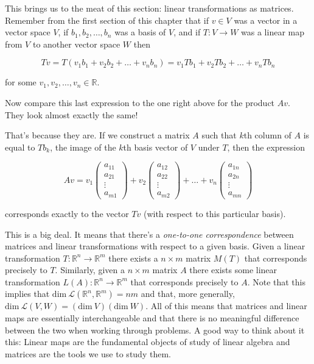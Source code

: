 \documentclass[12pt]{article}
\begin{document}
\vskip 3mm
This brings us to the meat of this section: linear transformations as matrices. Remember from the first section of this chapter that if $v \in V$ was a vector in a vector space $V$, if $b_1, b_2, \ldots, b_n$ was a basis of $V$, and if $T : V \rightarrow W$ was a linear map from $V$ to another vector space $W$ then

$$Tv = T(v_1 b_1 + v_2 b_2 + \ldots + v_n b_n) = v_1 Tb_1 + v_2 Tb_2 + \ldots + v_n Tb_n$$

for some $v_1, v_2, \ldots, v_n \in \mathbb{R}$.

\vskip 3mm

Now compare this last expression to the one right above for the product $Av$. They look almost exactly the same!

\vskip 2mm
That's because they are. If we construct a matrix $A$ such that $k$th column of $A$ is equal to $Tb_k$, the image of the $k$th basis vector of $V$ under $T$, then the expression

\[ Av = 
%
v_1  \begin{pmatrix}
a_{11} \\
a_{21} \\
\vdots \\
a_{m1}
\end{pmatrix} +
%
v_2  \begin{pmatrix}
a_{12} \\
a_{22} \\
\vdots \\
a_{m2}
\end{pmatrix} +
\ldots +
%
v_n  \begin{pmatrix}
a_{1n} \\
a_{2n} \\
\vdots \\
a_{mn}
\end{pmatrix} \]

\vskip 1mm

corresponds exactly to the vector $Tv$ (with respect to this particular basis).

\vskip 3mm
This is a big deal. It means that there's a \textit{one-to-one correspondence} between matrices and linear transformations with respect to a given basis. Given a linear transformation $T : \mathbb{R}^n \rightarrow \mathbb{R}^m$ there exists a $n \times m$ matrix $M(T)$ that corresponds precisely to $T$. Similarly, given a $n \times m$ matrix $A$ there exists some linear transformation $L(A) : \mathbb{R}^n \rightarrow \mathbb{R}^m$ that corresponds precisely to $A$. Note that this implies that $\textrm{dim} \: \mathcal{L}(\mathbb{R}^n, \mathbb{R}^m) = nm$ and that, more generally, $\textrm{dim} \: \mathcal{L}(V, W) = (\textrm{dim} \: V)(\textrm{dim} \: W)$. All of this means that matrices and linear maps are essentially interchangeable and that there is no meaningful difference between the two when working through problems. A good way to think about it this:  Linear maps are the fundamental objects of study of linear algebra and matrices are the tools we use to study them.
\end{document}
